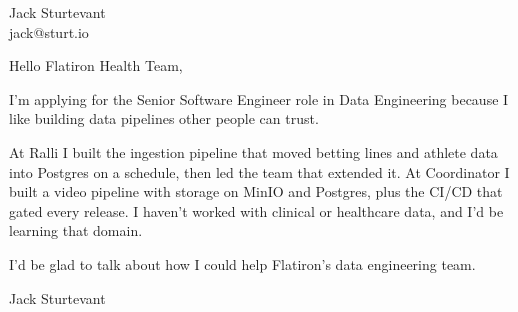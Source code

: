 \documentclass[11pt]{article}
\begin{document}
\raggedright

{\namefont\fontsize{20pt}{24pt}\selectfont Jack Sturtevant}\\[-0.3em]
jack@sturt.io

\vspace{1.2em}

Hello Flatiron Health Team,

I'm applying for the Senior Software Engineer role in Data Engineering because I like building data pipelines other people can trust.

At Ralli I built the ingestion pipeline that moved betting lines and athlete data into Postgres on a schedule, then led the team that extended it. At Coordinator I built a video pipeline with storage on MinIO and Postgres, plus the CI/CD that gated every release. I haven't worked with clinical or healthcare data, and I'd be learning that domain.

I'd be glad to talk about how I could help Flatiron's data engineering team.

\vspace{0.6em}
Jack Sturtevant
\end{document}

